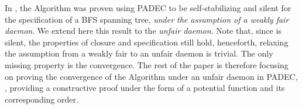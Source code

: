 In \cite{AltisenCD23}, the \BFS Algorithm was proven using PADEC to be
self-stabilizing and silent for the specification of a BFS spanning
tree, \emph{under the assumption of a weakly fair daemon}.  We extend
here this result to the \emph{unfair daemon}.  Note that, since \BFS
is silent, the properties of closure and specification still hold,
henceforth, relaxing the assumption from a weakly fair to an unfair
daemon is trivial.  The only missing property is the convergence.  The
rest of the paper is therefore focusing on proving the convergence of
the \BFS Algorithm under an unfair daemon in PADEC, \ie, providing a
constructive proof under the form of a potential function and its
corresponding order.
